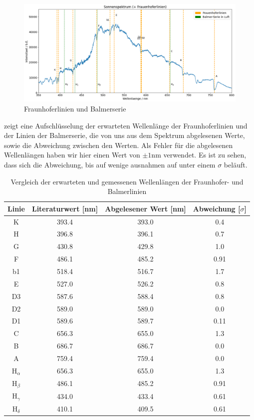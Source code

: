 \begin{figure}[H]
  \centering
  \includegraphics[width=\textwidth]{files/plots/spektrum_fraunhofer_balmer.png}
  \caption{Fraunhoferlinien und Balmerserie}
  \label{fig:spektrum_fraunhofer_balmer}
\end{figure}

 zeigt eine Aufschlüsselung der erwarteten Wellenlänge der Fraunhoferlinien und der Linien der Balmerserie, die von uns aus dem Spektrum abgelesenen Werte, sowie die Abweichung zwischen den Werten. Als Fehler für die abgelesenen Wellenlängen haben wir hier einen Wert von $\pm 1 \si{\nano\meter}$ verwendet. Es ist zu sehen, dass sich die Abweichung, bis auf wenige ausnahmen auf unter einem $\sigma$ beläuft.

\begin{table}[h]
  \centering
  \caption{Vergleich der erwarteten und gemessenen Wellenlängen der Fraunhofer- und Balmerlinien}
  \vspace*{0.5em}
  \begin{tabular}{c|c|c|c}
      \hline
      Linie & Literaturwert [nm] & Abgelesener Wert [nm] & Abweichung [$\sigma$] \\
      \hline
      K  & 393.4 & 393.0 & 0.4 \\
      H  & 396.8 & 396.1 & 0.7 \\
      G  & 430.8 & 429.8 & 1.0 \\
      F  & 486.1 & 485.2 & 0.91 \\
      b1 & 518.4 & 516.7 & 1.7 \\
      E  & 527.0 & 526.2 & 0.8 \\
      D3 & 587.6 & 588.4 & 0.8 \\
      D2 & 589.0 & 589.0 & 0.0 \\
      D1 & 589.6 & 589.7 & 0.11 \\
      C  & 656.3 & 655.0 & 1.3 \\
      B  & 686.7 & 686.7 & 0.0 \\
      A  & 759.4 & 759.4 & 0.0 \\
      \hline\hline
      $\mathrm{H}_{\alpha}$ & 656.3 & 655.0 & 1.3\\
      $\mathrm{H}_{\beta}$ & 486.1 & 485.2 & 0.91\\
      $\mathrm{H}_{\gamma}$ & 434.0 & 433.4 & 0.61\\
      $\mathrm{H}_{\delta}$ & 410.1 & 409.5 & 0.61\\
      \hline
  \end{tabular}
  \label{tab:fraunhofer_vergleich}
\end{table}

